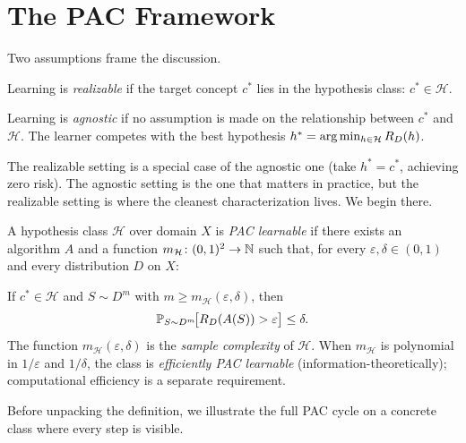 
\section{The PAC Framework}
\label{sec:pac-def}

Two assumptions frame the discussion.

\begin{defn}
\label{def:realizable}
  \leanok
Learning is \emph{realizable} if the target concept $c^*$ lies in the
hypothesis class: $c^* \in \mathcal{H}$.
\end{defn}

\begin{defn}
\label{def:agnostic}
  \leanok
Learning is \emph{agnostic} if no assumption is made on the relationship between
$c^*$ and $\mathcal{H}$.  The learner competes with the best hypothesis
$h^* = \arg\min_{h \in \mathcal{H}} R_D(h)$.
\end{defn}

The realizable setting is a special case of the agnostic one (take
$h^* = c^*$, achieving zero risk).  The agnostic setting is the one that
matters in practice, but the realizable setting is where the cleanest
characterization lives.  We begin there.

\begin{defn}
\label{def:pac}
  \leanok
A hypothesis class $\mathcal{H}$ over domain $X$ is \emph{PAC learnable} if
there exists an algorithm $A$ and a function $m_\mathcal{H} \colon
(0,1)^2 \to \mathbb{N}$ such that, for every $\varepsilon, \delta \in (0,1)$ and every
distribution $D$ on $X$:

If $c^* \in \mathcal{H}$ and $S \sim D^m$ with $m \geq
m_\mathcal{H}(\varepsilon, \delta)$, then
\[
  \mathbb{P}_{S \sim D^m}\!\bigl[R_D(A(S)) > \varepsilon\bigr] \leq \delta.
\]
The function $m_\mathcal{H}(\varepsilon, \delta)$ is the \emph{sample
complexity} of $\mathcal{H}$.  When $m_\mathcal{H}$ is polynomial in
$1/\varepsilon$ and $1/\delta$, the class is \emph{efficiently PAC learnable}
(information-theoretically); computational efficiency is a separate
requirement.
\end{defn}

Before unpacking the definition, we illustrate the full PAC cycle on a
concrete class where every step is visible.

